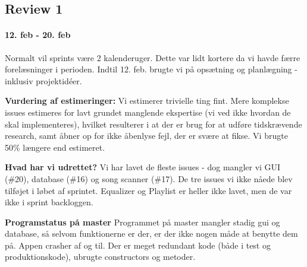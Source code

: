 \subsection*{Review 1}
\paragraph{12. feb - 20. feb}

Normalt vil sprints være 2 kalenderuger. Dette var lidt kortere da vi havde færre forelæsninger i perioden. Indtil 12. feb. brugte vi på opsætning og planlægning - inklusiv projektidéer.


\textbf{Vurdering af estimeringer:}
Vi estimerer trivielle ting fint.
Mere komplekse issues estimeres for lavt grundet manglende ekspertise (vi ved ikke hvordan de skal implementeres), hvilket resulterer i at der er brug for at udføre tidskrævende research, samt åbner op for ikke åbenlyse fejl, der er svære at fikse.
Vi brugte 50\% længere end estimeret.

\textbf{Hvad har vi udrettet?}
Vi har lavet de fleste issues - dog mangler vi GUI (\#20), database (\#16) og song scanner (\#17).
De tre issues vi ikke nåede blev tilføjet i løbet af sprintet.
Equalizer og Playlist er heller ikke lavet, men de var ikke i sprint backloggen.


\textbf{Programstatus på master}
Programmet på master mangler stadig gui og database, så selvom funktionerne er der, er der ikke nogen måde at benytte dem på.
Appen crasher af og til.
Der er meget redundant kode (både i test og produktionskode), ubrugte constructors og metoder.

